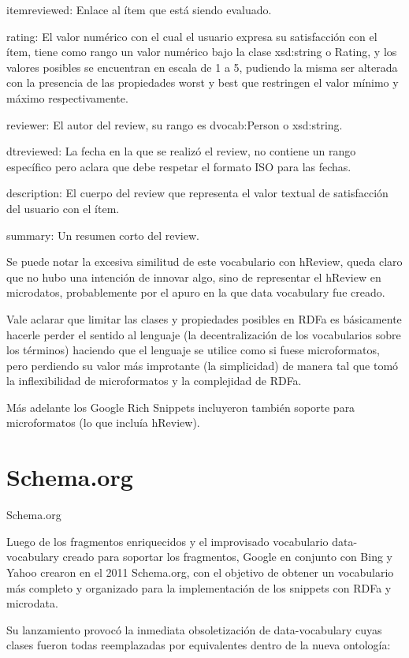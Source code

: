 itemreviewed: Enlace al ítem que está siendo evaluado.

rating: El valor numérico con el cual el usuario expresa su satisfacción con el ítem, tiene como rango un valor numérico bajo la clase 
xsd:string o Rating, y los valores posibles se encuentran en escala de 1 a 5, pudiendo la misma ser alterada con la presencia de las 
propiedades worst y best que restringen el valor mínimo y máximo respectivamente.

reviewer: El autor del review, su rango es dvocab:Person o xsd:string.

dtreviewed: La fecha en la que se realizó el review, no contiene un rango específico pero aclara que debe respetar el formato 
ISO para las fechas.

description: El cuerpo del review que representa el valor textual de satisfacción del usuario con el ítem.

summary: Un resumen corto del review.

Se puede notar la excesiva similitud de este vocabulario con hReview, queda claro que no hubo una intención de innovar algo, 
sino de representar el hReview en microdatos, probablemente por el apuro en la que data vocabulary fue creado.

Vale aclarar que limitar las clases y propiedades posibles en RDFa es básicamente hacerle perder el sentido al lenguaje 
(la decentralización de los vocabularios sobre los términos) haciendo que el lenguaje se utilice como si fuese microformatos, 
pero perdiendo su valor más improtante (la simplicidad) de manera tal que tomó la inflexibilidad de microformatos y la complejidad 
de RDFa.

Más adelante los Google Rich Snippets incluyeron también soporte para microformatos (lo que incluía hReview). 


\section{Schema.org}
Schema.org

Luego de los fragmentos enriquecidos y el improvisado vocabulario data-vocabulary creado para soportar los fragmentos, Google 
en conjunto con Bing y Yahoo crearon en el 2011 Schema.org, con el objetivo de obtener un vocabulario más completo y 
organizado para la implementación de los snippets con RDFa y microdata.

Su lanzamiento provocó la inmediata obsoletización de data-vocabulary cuyas clases fueron todas reemplazadas por equivalentes 
dentro de la nueva ontología:

